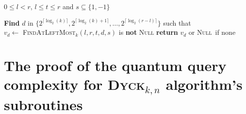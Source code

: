 \documentclass[11pt,a4paper]{article}
\newcommand{\Dyck}[1]{\textsc{Dyck$_{#1}$}}
\newcommand{\FFP}[1]{\textsc{FindFixedPos$_{#1}$}}
\newcommand{\FALM}[1]{\textsc{FindAtLeftMost$_{#1}$}}
\newcommand{\Null}{\textsc{Null}}
\theoremstyle{definition}
\theoremstyle{plain}
\theoremstyle{definition}
\begin{document}
\begin{appendix}
    \begin{algorithm}
        \caption{$\FFP{k}(l,r,t,s)$}
        \begin{algorithmic}
            \Require $0\leq l<r$, $l \leq t \leq r$ and $s \subseteq \{1, -1\}$

            \State \textbf{Find} $d$ in $\{2^{\lceil \log_2(k)\rceil }, 2^{\lceil \log_2(k)+1\rceil },\ldots,2^{\lceil \log_2(r-l)\rceil }\}$
            such that \\
            \hspace*{1cm} $v_d \gets $ \FALM{k}$(l,r,t,d,s)$ is \textbf{not} \Null
            \State \textbf{return} $v_d$ or \Null \ if none
        \end{algorithmic}
    \end{algorithm}

    \section{The proof of the quantum query complexity for \Dyck{k,n} algorithm's subroutines}


\end{appendix}
\end{document}
